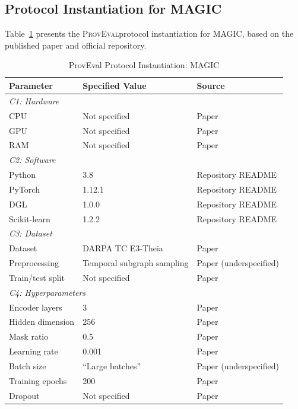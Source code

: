 \documentclass[11pt,a4paper]{article}
\newcommand{\system}[1]{\textsc{#1}}
\newcommand{\proveval}{\textsc{ProvEval}}
\begin{document}
\subsection{Protocol Instantiation for MAGIC}

Table~\ref{tab:magic-protocol} presents the \proveval protocol instantiation for \system{MAGIC}, based on the published paper \cite{jia2024magic} and official repository.

\begin{table}[H]
\centering
\caption{ProvEval Protocol Instantiation: MAGIC}
\label{tab:magic-protocol}
\begin{threeparttable}
\begin{tabular}{@{}lll@{}}
\toprule
\textbf{Parameter} & \textbf{Specified Value} & \textbf{Source} \\
\midrule
\multicolumn{3}{l}{\textit{C1: Hardware}} \\
\quad CPU & Not specified & Paper \\
\quad GPU & Not specified & Paper \\
\quad RAM & Not specified & Paper \\
\midrule
\multicolumn{3}{l}{\textit{C2: Software}} \\
\quad Python & 3.8 & Repository README \\
\quad PyTorch & 1.12.1 & Repository README \\
\quad DGL & 1.0.0 & Repository README \\
\quad Scikit-learn & 1.2.2 & Repository README \\
\midrule
\multicolumn{3}{l}{\textit{C3: Dataset}} \\
\quad Dataset & DARPA TC E3-Theia & Paper \\
\quad Preprocessing & Temporal subgraph sampling & Paper (underspecified) \\
\quad Train/test split & Not specified & Paper \\
\midrule
\multicolumn{3}{l}{\textit{C4: Hyperparameters}} \\
\quad Encoder layers & 3 & Paper \\
\quad Hidden dimension & 256 & Paper \\
\quad Mask ratio & 0.5 & Paper \\
\quad Learning rate & 0.001 & Paper \\
\quad Batch size & ``Large batches'' & Paper (underspecified) \\
\quad Training epochs & 200 & Paper \\
\quad Dropout & Not specified & Paper \\

\end{tabular}
\end{threeparttable}
\end{table}
\end{document}
